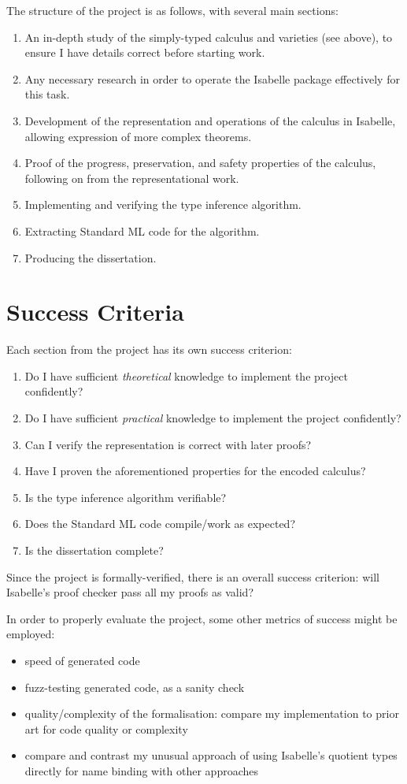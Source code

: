 \documentclass[12pt]{article}
\begin{document}
The structure of the project is as follows, with several main sections:
\begin{enumerate}
\item
An in-depth study of the simply-typed calculus and varieties (see above), to ensure I have details correct before starting work.
\item
Any necessary research in order to operate the Isabelle package effectively for this task.
\item
Development of the representation and operations of the calculus in Isabelle, allowing expression of more complex theorems.
\item
Proof of the progress, preservation, and safety properties of the calculus, following on from the representational work.
\item
Implementing and verifying the type inference algorithm.
\item
Extracting Standard ML code for the algorithm.
\item
Producing the dissertation.
\end{enumerate}

\section*{Success Criteria}
Each section from the project has its own success criterion:
\begin{enumerate}
\item
Do I have sufficient \emph{theoretical} knowledge to implement the project confidently?
\item
Do I have sufficient \emph{practical} knowledge to implement the project confidently?
\item
Can I verify the representation is correct with later proofs?
\item
Have I proven the aforementioned properties for the encoded calculus?
\item
Is the type inference algorithm verifiable?
\item
Does the Standard ML code compile/work as expected?
\item
Is the dissertation complete?
\end{enumerate}
Since the project is formally-verified, there is an overall success criterion: will Isabelle's proof checker pass all my proofs as valid?

In order to properly evaluate the project, some other metrics of success might be employed:
\begin{itemize}
\item
speed of generated code
\item
fuzz-testing generated code, as a sanity check
\item
quality/complexity of the formalisation: compare my implementation to prior art for code quality or complexity
\item
compare and contrast my unusual approach of using Isabelle's quotient types directly for name binding with other approaches
\end{itemize}
\end{document}
